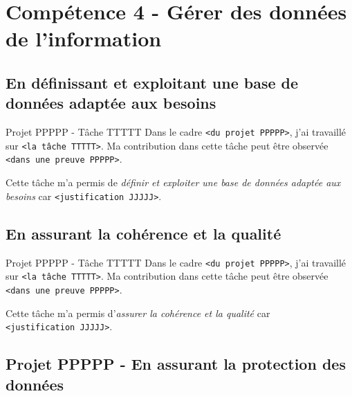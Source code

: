 \documentclass[%
    10pt,%
    usenames,%
    dvipsnames%
]{beamer}
\begin{document}
\section{Compétence 4 - Gérer des données de
l'information}\label{compuxe9tence-4---guxe9rer-des-donnuxe9es-de-linformation}

\subsection{En définissant et exploitant une base de données adaptée aux
besoins}\label{en-duxe9finissant-et-exploitant-une-base-de-donnuxe9es-adaptuxe9e-aux-besoins}

\begin{frame}[fragile]{Projet PPPPP - Tâche TTTTT}
\label{projet-ppppp---tuxe2che-ttttt-12}
Dans le cadre \texttt{\textless{}du\ projet\ PPPPP\textgreater{}}, j'ai
travaillé sur \texttt{\textless{}la\ tâche\ TTTTT\textgreater{}}. Ma
contribution dans cette tâche peut être observée
\texttt{\textless{}dans\ une\ preuve\ PPPPP\textgreater{}}.

Cette tâche m'a permis de \emph{définir et exploiter une base de données
adaptée aux besoins} car
\texttt{\textless{}justification\ JJJJJ\textgreater{}}.
\end{frame}

\subsection{En assurant la cohérence et la
qualité}\label{en-assurant-la-cohuxe9rence-et-la-qualituxe9}

\begin{frame}[fragile]{Projet PPPPP - Tâche TTTTT}
\label{projet-ppppp---tuxe2che-ttttt-13}
Dans le cadre \texttt{\textless{}du\ projet\ PPPPP\textgreater{}}, j'ai
travaillé sur \texttt{\textless{}la\ tâche\ TTTTT\textgreater{}}. Ma
contribution dans cette tâche peut être observée
\texttt{\textless{}dans\ une\ preuve\ PPPPP\textgreater{}}.

Cette tâche m'a permis d'\emph{assurer la cohérence et la qualité} car
\texttt{\textless{}justification\ JJJJJ\textgreater{}}.
\end{frame}

\subsection{Projet PPPPP - En assurant la protection des
données}\label{projet-ppppp---en-assurant-la-protection-des-donnuxe9es}
\end{document}
